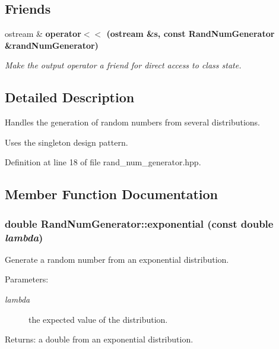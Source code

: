 \subsection*{Friends}
\begin{CompactItemize}
\item 
ostream \& \bf{operator$<$$<$} (ostream \&s, const \bf{Rand\-Num\-Generator} \&rand\-Num\-Generator)\label{classRandNumGenerator_58096b7f31bb31da493e1cd8cd1979eb}

\begin{CompactList}\small\item\em Make the output operator a friend for direct access to class state. \item\end{CompactList}\end{CompactItemize}


\subsection{Detailed Description}
Handles the generation of random numbers from several distributions. 

Uses the singleton design pattern. 



Definition at line 18 of file rand\_\-num\_\-generator.hpp.

\subsection{Member Function Documentation}
\subsubsection{\setlength{\rightskip}{0pt plus 5cm}double Rand\-Num\-Generator::exponential (const double {\em lambda})\hspace{0.3cm}{\tt  [inline]}}\label{classRandNumGenerator_e6cc0ca4aa542ee2bcd8b964f4c6cc57}


Generate a random number from an exponential distribution. 

\begin{Desc}
\item[Parameters:]
\begin{description}
\item[{\em lambda}]the expected value of the distribution. \end{description}
\end{Desc}
\begin{Desc}
\item[Returns:]a double from an exponential distribution. \end{Desc}



